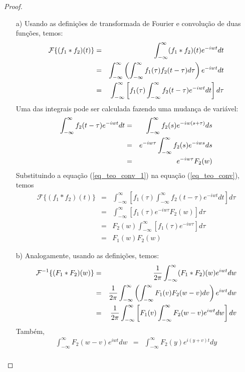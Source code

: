 \begin{proof}
\begin{itemize}
\item[a)] Usando as definições de transformada de Fourier e convolução de duas funções, temos:
\begin{eqnarray}
\nonumber \mathcal{F}\{(f_1*f_2)(t)\}&=&\int_{-\infty}^\infty (f_1*f_2)(t)e^{-iwt}dt\\
\nonumber &=&\int_{-\infty}^\infty \left(\int_{-\infty}^\infty f_1(\tau)f_2(t-\tau)d\tau\right)e^{-iwt}dt\\
&=&\int_{-\infty}^\infty \left[f_1(\tau) \int_{-\infty}^\infty f_2(t-\tau)e^{-iwt}dt\right]d\tau  {\label{eq_teo_conv}}
\end{eqnarray}
Uma das integrais pode ser calculada fazendo uma mudança de variável:
\begin{eqnarray}
\nonumber \int_{-\infty}^\infty f_2(t-\tau)e^{-iwt}dt&=&\int_{-\infty}^\infty f_2(s)e^{-iw(s+\tau)}ds \\
\nonumber &=&e^{-iw\tau}\int_{-\infty}^\infty f_2(s)e^{-iws}ds \\
&=&e^{-iw\tau}F_2(w) {\label{eq_teo_conv_1}}
\end{eqnarray}
Substituindo a equação (\ref{eq_teo_conv_1}) na equação (\ref{eq_teo_conv}), temos
\begin{eqnarray*}
\mathcal{F}\{(f_1*f_2)(t)\}&=&\int_{-\infty}^\infty \left[f_1(\tau) \int_{-\infty}^\infty f_2(t-\tau)e^{-iwt}dt\right]d\tau\\
&=&\int_{-\infty}^\infty \left[f_1(\tau) e^{-iw\tau}F_2(w)\right]d\tau\\
&=&F_2(w)\int_{-\infty}^\infty \left[f_1(\tau) e^{-iw\tau}\right]d\tau\\
&=&F_1(w)F_2(w)
\end{eqnarray*}
\item[b)] Analogamente, usando as definições, temos:
\begin{eqnarray}
\nonumber\mathcal{F}^{-1}\{(F_1*F_2)(w)\}&=&\frac{1}{2\pi}\int_{-\infty}^\infty (F_1*F_2)(w)e^{iwt}dw\\
\nonumber &=&\frac{1}{2\pi}\int_{-\infty}^\infty \left(\int_{-\infty}^\infty F_1(v)F_2(w-v)dv \right)e^{iwt}dw\\
&=&\frac{1}{2\pi}\int_{-\infty}^\infty\left[ F_1(v) \int_{-\infty}^\infty F_2(w-v)e^{iwt}dw \right]dv {\label{eq_teo_conv_2}}
\end{eqnarray}
Também,
\begin{eqnarray}
\nonumber \int_{-\infty}^\infty F_2(w-v)e^{iwt}dw&=&\int_{-\infty}^\infty F_2(y)e^{i(y+v)t}dy \\

\end{eqnarray}
\end{itemize}
\end{proof}
